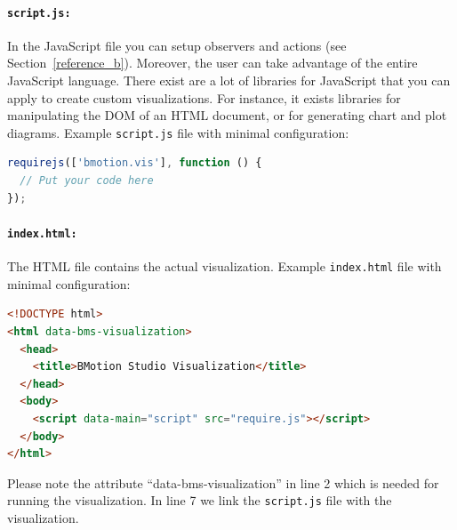 \paragraph{\texttt{script.js:}}
In the JavaScript file you can setup observers and actions (see Section~\ref{reference_b}).
Moreover, the user can take advantage of the entire JavaScript language.
There exist are a lot of libraries for JavaScript that you can apply to create custom visualizations.
For instance, it exists libraries for manipulating the DOM of an HTML document, or for generating chart and plot diagrams.
Example \texttt{script.js} file with minimal configuration:

\begin{lstlisting}[language=JavaScript]
requirejs(['bmotion.vis'], function () {
  // Put your code here
});
\end{lstlisting}


\paragraph{\texttt{index.html:}}
The HTML file contains the actual visualization.
Example \texttt{index.html} file with minimal configuration:

\begin{lstlisting}[language=html]
<!DOCTYPE html>
<html data-bms-visualization>
  <head>
    <title>BMotion Studio Visualization</title>
  </head>
  <body>
    <script data-main="script" src="require.js"></script>
  </body>
</html>
\end{lstlisting}

Please note the attribute ``data-bms-visualization'' in line 2 which is needed for running the visualization.
In line 7 we link the \texttt{script.js} file with the visualization.


